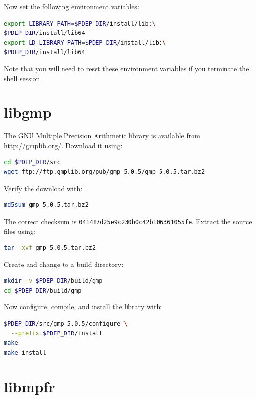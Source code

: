 \documentclass[a4paper]{article}
\begin{document}
Now set the following environment variables:
\begin{lstlisting}[language = bash, frame = single]
export LIBRARY_PATH=$PDEP_DIR/install/lib:\
$PDEP_DIR/install/lib64
export LD_LIBRARY_PATH=$PDEP_DIR/install/lib:\
$PDEP_DIR/install/lib64
\end{lstlisting}
Note that you will need to reset these environment variables if you
terminate the shell session.

\section{libgmp}

The GNU Multiple Precision Arithmetic library is available from
\url{http://gmplib.org/}. Download it using:
\begin{lstlisting}[language = bash, frame = single]
cd $PDEP_DIR/src
wget ftp://ftp.gmplib.org/pub/gmp-5.0.5/gmp-5.0.5.tar.bz2
\end{lstlisting}
Verify the download with:
\begin{lstlisting}[language = bash, frame = single]
md5sum gmp-5.0.5.tar.bz2
\end{lstlisting}
The correct checksum is \verb+041487d25e9c230b0c42b106361055fe+. Extract the
source files using:
\begin{lstlisting}[language = bash, frame = single]
tar -xvf gmp-5.0.5.tar.bz2
\end{lstlisting}
Create and change to a build directory:
\begin{lstlisting}[language = bash, frame = single]
mkdir -v $PDEP_DIR/build/gmp
cd $PDEP_DIR/build/gmp
\end{lstlisting}
Now configure, compile, and install the library with:
\begin{lstlisting}[language = bash, frame = single]
$PDEP_DIR/src/gmp-5.0.5/configure \
  --prefix=$PDEP_DIR/install
make
make install
\end{lstlisting}

\section{libmpfr}
\end{document}

